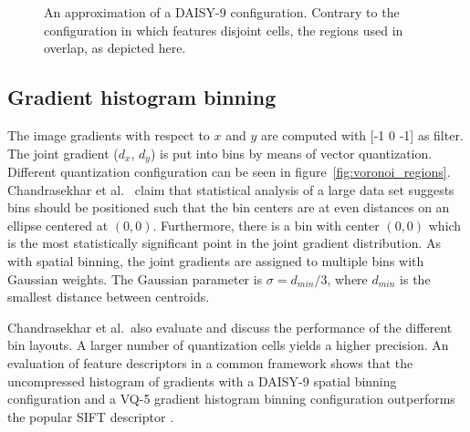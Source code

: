 \begin{figure}
    \centering
    \caption{
        An approximation of a DAISY-9 configuration. Contrary to the configuration in \cite{best_daisy} which features disjoint cells, the regions used in \cite{chog2011} overlap, as depicted here.
        \label{fig:daisy_regions}
    }
\end{figure}


\subsection{Gradient histogram binning}

The image gradients with respect to $x$ and $y$ are computed with [-1 0 -1] as filter. The joint gradient ($d_x$, $d_y$) is put into bins by means of vector quantization. Different quantization configuration can be seen in figure~\ref{fig:voronoi_regions}. Chandrasekhar et al.\ \cite{chog2011} claim that statistical analysis of a large data set suggests bins should be positioned such that the bin centers are at even distances on an ellipse centered at $(0,0)$. Furthermore, there is a bin with center $(0,0)$ which is the most statistically significant point in the joint gradient distribution. As with spatial binning, the joint gradients are assigned to multiple bins with Gaussian weights. The Gaussian parameter is $\sigma = d_{min}/3$, where $d_{min}$ is the smallest distance between centroids.

Chandrasekhar et al.\ also evaluate and discuss the performance of the different bin layouts. A larger number of quantization cells yields a higher precision. An evaluation of feature descriptors in a common framework \cite{chog2011} shows that the uncompressed histogram of gradients with a DAISY-9 spatial binning configuration and a VQ-5 gradient histogram binning configuration outperforms the popular SIFT descriptor \cite{Lowe04distinctiveimage}.

